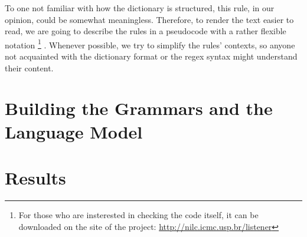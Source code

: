 To one not familiar with how the dictionary is structured, this rule, in our opinion, could be somewhat meaningless. Therefore,  to 
render the text easier to read, we are going to describe the rules in a pseudocode with a rather flexible notation
\footnote{For those who are insterested in checking the code itself, it can be downloaded on the site of the project:
\url{http://nilc.icmc.usp.br/listener}}
.
Whenever possible, we try to simplify the rules' contexts, so anyone not acquainted with the dictionary format or the
\ac{regex} syntax might understand their content.

\section{Building the Grammars and the Language Model}
\section{Results}




